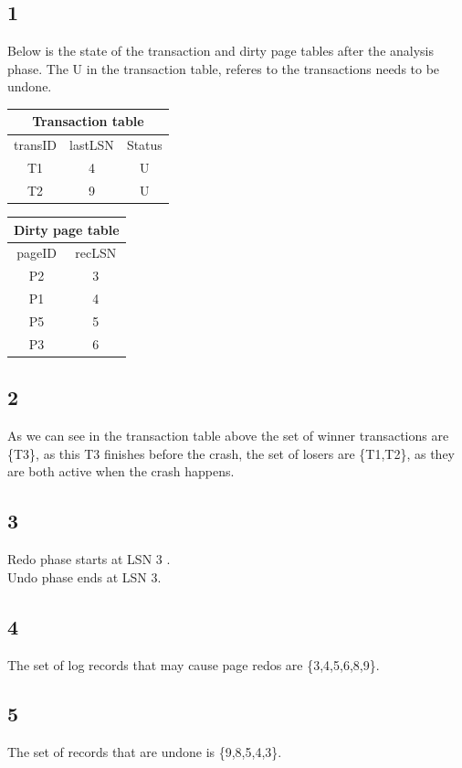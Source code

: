 \documentclass{article}
\theoremstyle{plain}
\theoremstyle{nonumberplain}
\begin{document}
\subsection*{1}

Below is the state of the transaction and dirty page tables after the analysis phase.
The U in the transaction table, referes to the transactions needs to be undone.\\
\begin{tabular}{| c | c | c |}
	\hline
	\multicolumn{3}{|c|}{Transaction table} \\
	\hline
	transID & lastLSN & Status\\
	\hline
	T1 & 4 & U\\
	\hline
	T2 & 9 & U\\
	\hline
\end{tabular}
\begin{tabular}{| c | c |}
	\hline
	\multicolumn{2}{|c|}{Dirty page table} \\
	\hline
	pageID & recLSN \\
	\hline
	P2 & 3 \\
	\hline
	P1 & 4 \\
	\hline
	P5 & 5 \\
	\hline
	P3 & 6 \\
	\hline
\end{tabular}

\subsection*{2}

As we can see in the transaction table above the set of winner transactions are \{T3\}, as this T3 finishes before the crash, the set of losers are \{T1,T2\}, as they are both active when the crash happens.

\subsection*{3}
Redo phase starts at LSN 3 .\\
Undo phase ends at LSN 3.

\subsection*{4}
The set of log records that may cause page redos are \{3,4,5,6,8,9\}.

\subsection*{5}
The set of records that are undone is \{9,8,5,4,3\}.
\end{document}
